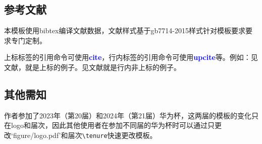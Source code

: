 \subsection{参考文献}

本模板使用bibtex编译文献数据，文献样式基于gb7714-2015样式针对模板要求要求专门定制。

上标标签的引用命令可使用\textcolor{blue}{\textbf{cite}}，行内标签的引用命令可使用\textcolor{blue}{\textbf{upcite}}等。例如：见文献\cite{hutao2024-ji,sobola2001-global,mittelbach2004-latex}，就是上标的例子。见文献就是行内非上标的例子。 

\subsection{其他需知}
作者参加了2023年（第20届）和2024年（第21届）华为杯，这两届的模板的变化只在logo和届次，因此其他使用者在参加不同届的华为杯时可以通过只更改`figure/logo.pdf'和届次\verb|\tenure|快速更改模板。